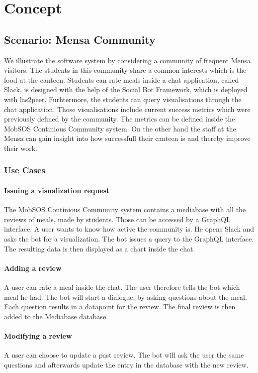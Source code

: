 \chapter{Concept}
\section{Scenario: Mensa Community}
We illustrate the software system by considering a community of frequent Mensa visitors. The students in this community share a common interests which is the food at the canteen. Students can rate meals inside a chat application, called Slack, is designed with the help of the Social Bot Framework, which is deployed with las2peer. Furhtermore, the students can query visualisations through the chat application. Those visualisations include current success metrics which were previously defined by the community. The metrics can be defined inside the MobSOS Continious Community system. On the other hand the staff at the Mensa can gain insight into how successfull their canteen is and thereby improve their work.

\subsection{Use Cases}

\subsubsection{Issuing a visualization request} The MobSOS Continious Community system contains a mediabase with all the reviews of meals, made by students. Those can be accessed by a GraphQL interface. A user wants to know how active the community is. He opens Slack and asks the bot for a visualization. The bot issues a query to the GraphQL interface. The resulting data is then displayed as a chart inside the chat.

\subsubsection{Adding a review} A user can rate a meal inside the chat. The user therefore tells the bot which meal he had. The bot will start a dialogue, by asking questions about the meal. Each question results in a datapoint for the review. The final review is then added to the Mediabase database.

\subsubsection{Modifying a review} A user can choose to update a past review. The bot will ask the user the same questions and afterwards update the entry in the database with the new review.

